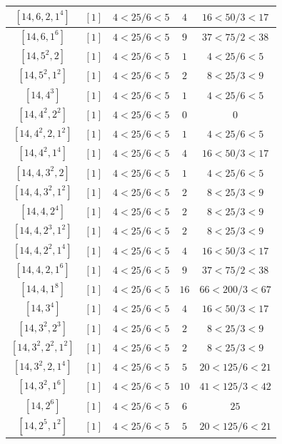 \documentclass{article}%
\begin{document}
\begin{center}
\begin{longtable}{||c|c|c|c|c||}
$[14, 6, 2, 1^{4}]$ & $[1]$ & $4 < 25/6 < 5$ & $4$ & $16 < 50/3 < 17$ \\ \hline 
$[14, 6, 1^{6}]$ & $[1]$ & $4 < 25/6 < 5$ & $9$ & $37 < 75/2 < 38$ \\ \hline 
$[14, 5^{2}, 2]$ & $[1]$ & $4 < 25/6 < 5$ & $1$ & $4 < 25/6 < 5$ \\ \hline 
$[14, 5^{2}, 1^{2}]$ & $[1]$ & $4 < 25/6 < 5$ & $2$ & $8 < 25/3 < 9$ \\ \hline 
$[14, 4^{3}]$ & $[1]$ & $4 < 25/6 < 5$ & $1$ & $4 < 25/6 < 5$ \\ \hline 
$[14, 4^{2}, 2^{2}]$ & $[1]$ & $4 < 25/6 < 5$ & $0$ & $0$ \\ \hline 
$[14, 4^{2}, 2, 1^{2}]$ & $[1]$ & $4 < 25/6 < 5$ & $1$ & $4 < 25/6 < 5$ \\ \hline 
$[14, 4^{2}, 1^{4}]$ & $[1]$ & $4 < 25/6 < 5$ & $4$ & $16 < 50/3 < 17$ \\ \hline 
$[14, 4, 3^{2}, 2]$ & $[1]$ & $4 < 25/6 < 5$ & $1$ & $4 < 25/6 < 5$ \\ \hline 
$[14, 4, 3^{2}, 1^{2}]$ & $[1]$ & $4 < 25/6 < 5$ & $2$ & $8 < 25/3 < 9$ \\ \hline 
$[14, 4, 2^{4}]$ & $[1]$ & $4 < 25/6 < 5$ & $2$ & $8 < 25/3 < 9$ \\ \hline 
$[14, 4, 2^{3}, 1^{2}]$ & $[1]$ & $4 < 25/6 < 5$ & $2$ & $8 < 25/3 < 9$ \\ \hline 
$[14, 4, 2^{2}, 1^{4}]$ & $[1]$ & $4 < 25/6 < 5$ & $4$ & $16 < 50/3 < 17$ \\ \hline 
$[14, 4, 2, 1^{6}]$ & $[1]$ & $4 < 25/6 < 5$ & $9$ & $37 < 75/2 < 38$ \\ \hline 
$[14, 4, 1^{8}]$ & $[1]$ & $4 < 25/6 < 5$ & $16$ & $66 < 200/3 < 67$ \\ \hline 
$[14, 3^{4}]$ & $[1]$ & $4 < 25/6 < 5$ & $4$ & $16 < 50/3 < 17$ \\ \hline 
$[14, 3^{2}, 2^{3}]$ & $[1]$ & $4 < 25/6 < 5$ & $2$ & $8 < 25/3 < 9$ \\ \hline 
$[14, 3^{2}, 2^{2}, 1^{2}]$ & $[1]$ & $4 < 25/6 < 5$ & $2$ & $8 < 25/3 < 9$ \\ \hline 
$[14, 3^{2}, 2, 1^{4}]$ & $[1]$ & $4 < 25/6 < 5$ & $5$ & $20 < 125/6 < 21$ \\ \hline 
$[14, 3^{2}, 1^{6}]$ & $[1]$ & $4 < 25/6 < 5$ & $10$ & $41 < 125/3 < 42$ \\ \hline 
$[14, 2^{6}]$ & $[1]$ & $4 < 25/6 < 5$ & $6$ & $25$ \\ \hline 
$[14, 2^{5}, 1^{2}]$ & $[1]$ & $4 < 25/6 < 5$ & $5$ & $20 < 125/6 < 21$ \\ \hline 

\end{longtable}
\end{center}
\end{document}
